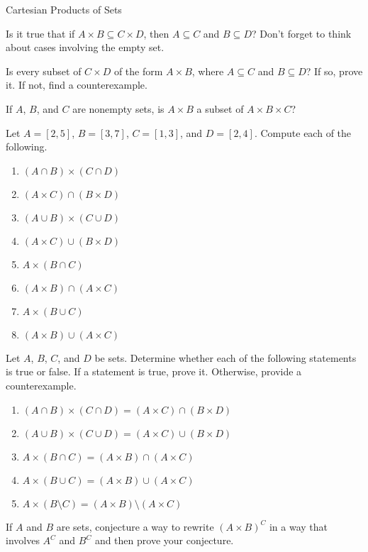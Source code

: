 \begin{section}{Cartesian Products of Sets}
\begin{problem}
Is it true that if $A\times B\subseteq C\times D$, then $A\subseteq C$ and $B\subseteq D$?  Don't forget to think about cases involving the empty set.
\end{problem}

\begin{problem}
Is every subset of $C\times D$ of the form $A\times B$, where $A\subseteq C$ and $B\subseteq D$?  If so, prove it.  If not, find a counterexample.
\end{problem}

\begin{problem}
If $A$, $B$, and $C$ are nonempty sets, is $A\times B$ a subset of $A\times B\times C$?
\end{problem}

\begin{problem}
Let $A=[2,5]$, $B=[3,7]$, $C=[1,3]$, and $D=[2,4]$.  Compute each of the following.
\begin{enumerate}[label=\textrm{(\alph*)}]
\item $(A\cap B)\times (C\cap D)$
\item $(A\times C)\cap (B\times D)$
\item $(A\cup B)\times (C\cup D)$
\item $(A\times C)\cup (B\times D)$
\item $A\times (B\cap C)$
\item $(A\times B)\cap (A\times C)$
\item $A\times (B\cup C)$
\item $(A\times B)\cup (A\times C)$
\end{enumerate}
\end{problem}

\begin{problem}
Let $A$, $B$, $C$, and $D$ be sets.  Determine whether each of the following statements is true or false.  If a statement is true, prove it.  Otherwise, provide a counterexample.
\begin{enumerate}[label=\textrm{(\alph*)}]
\item $(A\cap B)\times (C\cap D)=(A\times C)\cap (B\times D)$
\item $(A\cup B)\times (C\cup D)=(A\times C)\cup (B\times D)$
\item $A\times (B\cap C)=(A\times B)\cap (A\times C)$
\item $A\times (B\cup C)=(A\times B)\cup (A\times C)$
\item $A\times (B\setminus C) = (A\times B)\setminus (A\times C)$
\end{enumerate}
\end{problem}

\begin{problem}
If $A$ and $B$ are sets, conjecture a way to rewrite $(A\times B)^C$ in a way that involves $A^C$ and $B^C$ and then prove your conjecture.
\end{problem}

\end{section}